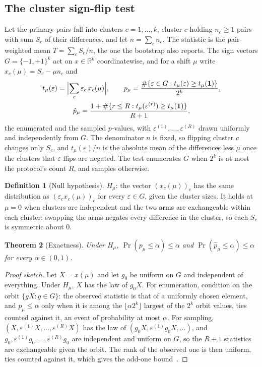 \documentclass[11pt]{article}
\theoremstyle{plain}
\newtheorem{theorem}{Theorem}[section]
\theoremstyle{definition}
\newtheorem{definition}[theorem]{Definition}
\theoremstyle{remark}
\newcommand{\sgn}{\varepsilon}
\newcommand{\one}{\mathbf{1}}
\begin{document}
\subsection{The cluster sign-flip test}\label{sec:signflip}

Let the primary pairs fall into clusters $c = 1, \dots, k$, cluster $c$ holding $n_c \ge 1$
pairs with sum $S_c$ of their differences, and let $n = \sum_c n_c$. The statistic is the
pair-weighted mean $T = \sum_c S_c / n$, the one the bootstrap also reports. The sign vectors
$G = \{-1, +1\}^k$ act on $x \in \mathbb{R}^k$ coordinatewise, and for a shift $\mu$ write
$x_c(\mu) = S_c - \mu n_c$ and
\begin{gather*}
  t_\mu(\sgn) = \Bigl|\sum_c \sgn_c\, x_c(\mu)\Bigr|, \qquad
  p_\mu = \frac{\#\{\sgn \in G : t_\mu(\sgn) \ge t_\mu(\one)\}}{2^k}, \\
  \hat p_\mu = \frac{1 + \#\{r \le R : t_\mu(\sgn^{(r)}) \ge t_\mu(\one)\}}{R + 1},
\end{gather*}
the enumerated and the sampled $p$-values, with $\sgn^{(1)}, \dots, \sgn^{(R)}$ drawn uniformly and
independently from $G$. The denominator $n$ is fixed, so flipping cluster $c$ changes only $S_c$,
and $t_\mu(\sgn)/n$ is the absolute mean of the differences less $\mu$ once the clusters that
$\sgn$ flips are negated. The
test enumerates $G$ when $2^k$ is at most the protocol's count $R$, and samples otherwise.

\begin{definition}[Null hypothesis]
$H_\mu$: the vector $(x_c(\mu))_c$ has the same distribution as $(\sgn_c x_c(\mu))_c$ for every
$\sgn \in G$, given the cluster sizes. It holds at $\mu = 0$ when clusters are independent and the
two arms are exchangeable within each cluster: swapping the arms negates every difference in the
cluster, so each $S_c$ is symmetric about 0.
\end{definition}

\begin{theorem}[Exactness]\label{thm:exact}
Under $H_\mu$, $\Pr(p_\mu \le \alpha) \le \alpha$ and $\Pr(\hat p_\mu \le \alpha) \le \alpha$ for
every $\alpha \in (0, 1)$.
\end{theorem}
\begin{proof}[Proof sketch]
Let $X = x(\mu)$ and let $g_0$ be uniform on $G$ and independent of everything. Under $H_\mu$,
$X$ has the law of $g_0 X$. For enumeration, condition on the orbit $\{gX : g \in G\}$: the
observed statistic is that of a uniformly chosen element, and $p_\mu \le \alpha$ only when it is
among the $\lfloor \alpha 2^k \rfloor$ largest of the $2^k$ orbit values, ties counted against it,
an event of probability at most $\alpha$. For sampling, $(X, \sgn^{(1)}X, \dots, \sgn^{(R)}X)$ has the law of $(g_0X,
\sgn^{(1)}g_0X, \dots)$, and $g_0, \sgn^{(1)}g_0, \dots, \sgn^{(R)}g_0$ are independent and uniform
on $G$, so the $R+1$ statistics are exchangeable given the orbit. The rank of the observed one is
then uniform, ties counted against it, which gives the add-one bound~\cite{phipson2010,lehmann2005}.
\end{proof}
\end{document}

